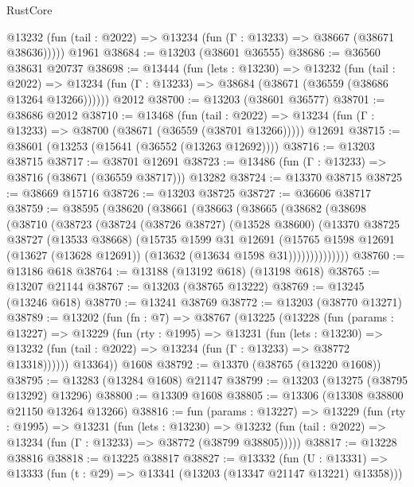 \begin{lexlean}{RustCore}
\begin{coremodule}
      @13232 (fun (tail : @2022) => @13234 (fun (Γ : @13233) => @38667 (@38671 @38636)))))
    @1961
@38684 := @13203 (@38601 @36555)
@38686 := @36560 @38631 @20737
@38698 := @13444
    (fun (lets : @13230) =>
    @13232
      (fun (tail : @2022) =>
      @13234 (fun (Γ : @13233) => @38684 (@38671 (@36559 (@38686 @13264 @13266))))))
    @2012
@38700 := @13203 (@38601 @36577)
@38701 := @38686 @2012
@38710 := @13468
    (fun (tail : @2022) => @13234 (fun (Γ : @13233) => @38700 (@38671 (@36559 (@38701 @13266)))))
    @12691
@38715 := @38601 (@13253 (@15641 (@36552 (@13263 @12692))))
@38716 := @13203 @38715
@38717 := @38701 @12691
@38723 := @13486 (fun (Γ : @13233) => @38716 (@38671 (@36559 @38717))) @13282
@38724 := @13370 @38715
@38725 := @38669 @15716
@38726 := @13203 @38725
@38727 := @36606 @38717
@38759 := @38595
    (@38620
      (@38661
        (@38663
          (@38665
            (@38682
              (@38698
                (@38710
                  (@38723
                    (@38724
                      (@38726 @38727)
                      (@13528 @38600)
                      (@13370
                        @38725
                        @38727
                        (@13533 @38668)
                        (@15735
                          @1599
                          @31
                          @12691
                          (@15765
                            @1598
                            @12691
                            (@13627 (@13628 @12691))
                            (@13632 (@13634 @1598 @31))))))))))))))
@38760 := @13186 @618
@38764 := @13188 (@13192 @618) (@13198 @618)
@38765 := @13207 @21144
@38767 := @13203 (@38765 @13222)
@38769 := @13245 (@13246 @618)
@38770 := @13241 @38769
@38772 := @13203 (@38770 @13271)
@38789 := @13202
    (fun (fn : @7) =>
    @38767
      (@13225
        (@13228
          (fun (params : @13227) =>
          @13229
            (fun (rty : @1995) =>
            @13231
              (fun (lets : @13230) =>
              @13232 (fun (tail : @2022) => @13234 (fun (Γ : @13233) => @38772 @13318))))))
        @13364))
    @1608
@38792 := @13370 (@38765 (@13220 @1608))
@38795 := @13283 (@13284 @1608) @21147
@38799 := @13203 (@13275 (@38795 @13292) @13296)
@38800 := @13309 @1608
@38805 := @13306 (@13308 @38800 @21150 @13264 @13266)
@38816 := fun (params : @13227) =>
  @13229
    (fun (rty : @1995) =>
    @13231
      (fun (lets : @13230) =>
      @13232 (fun (tail : @2022) => @13234 (fun (Γ : @13233) => @38772 (@38799 @38805)))))
@38817 := @13228 @38816
@38818 := @13225 @38817
@38827 := @13332
    (fun (U : @13331) => @13333 (fun (t : @29) => @13341 (@13203 (@13347 @21147 @13221) @13358)))

\end{coremodule}
\end{lexlean}

